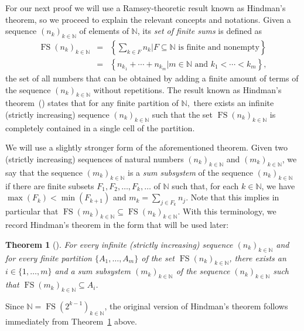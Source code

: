 \documentclass[12pt]{amsart}
\newtheorem{theorem}{Theorem}[section]
\theoremstyle{definition}
\numberwithin{equation}{section}
\DeclareMathOperator{\fs}{FS}
\begin{document}
For our next proof we will use a Ramsey-theoretic result known as Hindman's theorem, so we proceed to explain 
the relevant concepts and notations. Given a sequence $(n_k)_{k\in\mathbb N}$ of elements of $\mathbb N$, 
its {\em set of finite sums} is defined as
\begin{eqnarray*}
\fs(n_k)_{k\in\mathbb N} & = & \left\{\sum_{k\in F}n_k\bigg|F\subseteq\mathbb N\text{ is finite and 
nonempty}\right\} \\
 & = & \left\{n_{k_1}+\cdots+n_{k_m}\big|m\in\mathbb N\text{ and }k_1<\cdots<k_m\right\},
\end{eqnarray*}
the set of all numbers that can be obtained by adding a finite amount of terms of the sequence 
$(n_k)_{k\in\mathbb N}$ without repetitions. The result known as Hindman's 
theorem~(\cite[Theorem~3.1]{hindman-thm}) states that for any finite partition of $\mathbb N,$ there exists an infinite (strictly increasing) sequence $(n_k)_{k\in\mathbb N}$ such that the set $\fs(n_k)_{k\in\mathbb N}$ is completely contained in a single cell of the partition.

We will use a slightly stronger form of the aforementioned theorem. Given two (strictly increasing) sequences of natural numbers $(n_k)_{k\in\mathbb N}$ and $(m_k)_{k\in\mathbb N}$, we say that the sequence 
$(m_k)_{k\in\mathbb N}$ is a {\em sum subsystem} of the sequence $(n_k)_{k\in\mathbb N}$ if there are finite subsets $F_1,F_2,\ldots,F_k,\ldots$ of $\mathbb N$ such that, for each  $k \in \mathbb N$, we have 
$\max(F_k)<\min(F_{k+1})$ and $m_k=\sum_{j\in F_k}n_j$. Note that this implies in particular that 
$\fs(m_k)_{k\in\mathbb N}\subseteq\fs(n_k)_{k\in\mathbb N}$. With this terminology, we record Hindman's theorem in the form that will be
used later:

\begin{theorem}[{\cite[Corollary~5.15]{hindman-strauss}}] \label{hindmanthm}
For every infinite \emph{(}strictly increasing\emph{)} sequence $(n_k)_{k\in\mathbb N}$ and for every finite partition $\{A_1,\ldots,A_m\}$ of the set $\fs(n_k)_{k\in\mathbb N}$, there exists an $i\in\{1,\ldots,m\}$ and a sum subsystem $(m_k)_{k\in\mathbb N}$ of the sequence $(n_k)_{k\in\mathbb N}$ such that $\fs(m_k)_{k\in\mathbb N}\subseteq A_i$.
\end{theorem}

Since $\mathbb N=\fs(2^{k-1})_{k\in\mathbb N}$, the original version of Hindman's theorem follows immediately from Theorem~\ref{hindmanthm} above.
\end{document}
